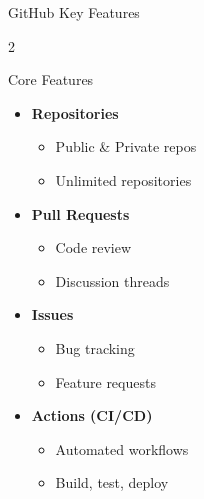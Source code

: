 \documentclass[aspectratio=169]{beamer}
\begin{document}
	\begin{frame}{GitHub Key Features}
		\begin{multicols}{2}
			\begin{block}{Core Features}
				\begin{itemize}
					\item \textbf{Repositories}
					\begin{itemize}
						\item Public \& Private repos
						\item Unlimited repositories
					\end{itemize}
					\item \textbf{Pull Requests}
					\begin{itemize}
						\item Code review
						\item Discussion threads
					\end{itemize}
					\item \textbf{Issues}
					\begin{itemize}
						\item Bug tracking
						\item Feature requests
					\end{itemize}
					\item \textbf{Actions (CI/CD)}
					\begin{itemize}
						\item Automated workflows
						\item Build, test, deploy
					\end{itemize}
				\end{itemize}
			\end{block}
			
			\columnbreak
			

\end{multicols}
\end{frame}
\end{document}
